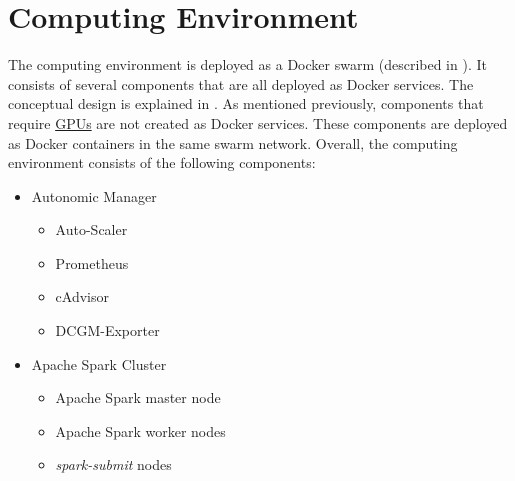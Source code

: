 

\section{Computing Environment}
\label{sec:06_env}
The computing environment is deployed as a Docker swarm (described in ). It consists of several components that are all deployed as Docker services. The conceptual design is explained in .
As mentioned previously, components that require \hyperlink{abbr:gpu}{GPUs} are not created as Docker services. These components are deployed as Docker containers in the same swarm network.
Overall, the computing environment consists of the following components:
\begin{itemize}
\item Autonomic Manager
\begin{itemize}
\item Auto-Scaler
\item Prometheus
\item cAdvisor
\item DCGM-Exporter
\end{itemize}

\item Apache Spark Cluster
\begin{itemize}
\item Apache Spark master node
\item Apache Spark worker nodes
\item \textit{spark-submit} nodes
\end{itemize}
\end{itemize}


